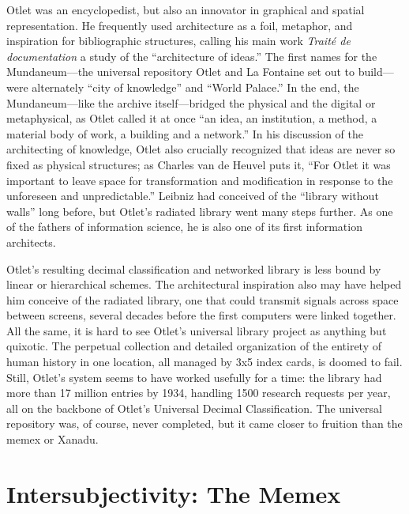 Otlet was an encyclopedist, but also an innovator in graphical and spatial representation. He frequently used architecture as a foil, metaphor, and inspiration for bibliographic structures, calling his main work \emph{Trait\'{e} de documentation} a study of the ``architecture of ideas.''\autocite[129]{van_de_heuvel_building_2008} The first names for the Mundaneum---the universal repository Otlet and La Fontaine set out to build---were alternately ``city of knowledge'' and ``World Palace.'' In the end, the Mundaneum---like the archive itself---bridged the physical and the digital or metaphysical, as Otlet called it at once ``an idea, an institution, a method, a material body of work, a building and a network.''\autocite[130]{van_de_heuvel_building_2008} In his discussion of the architecting of knowledge, Otlet also crucially recognized that ideas are never so fixed as physical structures; as Charles van de Heuvel puts it, ``For Otlet it was important to leave space for transformation and modification in response to the unforeseen and unpredictable.''\autocite[131]{van_de_heuvel_building_2008} Leibniz had conceived of the ``library without walls'' long before, but Otlet's radiated library went many steps further. As one of the fathers of information science, he is also one of its first information architects.

Otlet's resulting decimal classification and networked library is less bound by linear or hierarchical schemes. The architectural inspiration also may have helped him conceive of the radiated library, one that could transmit signals across space between screens, several decades before the first computers were linked together. All the same, it is hard to see Otlet's universal library project as anything but quixotic. The perpetual collection and detailed organization of the entirety of human history in one location, all managed by 3x5 index cards, is doomed to fail. Still, Otlet's system seems to have worked usefully for a time: the library had more than 17 million entries by 1934, handling 1500 research requests per year, all on the backbone of Otlet's Universal Decimal Classification.\autocite{_limited_2001} The universal repository was, of course, never completed, but it came closer to fruition than the memex or Xanadu.


\section{Intersubjectivity: The Memex}

